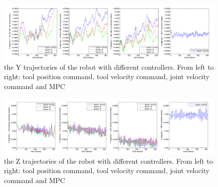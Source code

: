 \begin{figure}
\centering
\includegraphics[width=1.1\linewidth]{trajectory_data_Y.pdf}
\caption{the Y trajectories of the robot with different controllers. From left to right: tool position command, tool velocity command, joint velocity command and \acs{MPC}}
\label{fig:trajectory_data_Y}
\end{figure}
\begin{figure}
\centering
\includegraphics[width=1.1\linewidth]{trajectory_data_Z.pdf}
\caption{the Z trajectories of the robot with different controllers. From left to right: tool position command, tool velocity command, joint velocity command and \acs{MPC}}
\label{fig:trajectory_data_Z}
\end{figure}

 

